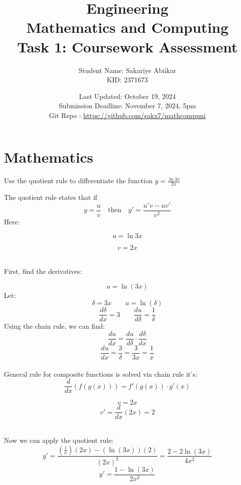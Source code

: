 \documentclass[a4paper, 12pt]{report}
\title{\vspace{3em} \Huge \textbf{Engineering\\ Mathematics and Computing}\\ \vspace{1em} \Large Task 1: Coursework Assessment}
\author{Student Name: Sakariye Abiikar\\ KID: 2371673}
\date{Last Updated: October 19, 2024\\ Submission Deadline: November 7, 2024, 5pm \\[1em] Git Repo : \color{blue}\url{https://github.com/sakx7/mathcompuni}}
\begin{document}
    
    \maketitle
    \thispagestyle{empty}
    
    \newpage
    \thispagestyle{empty}

    \chapter{Mathematics}
    
    \newpage\centering\restoregeometry
    
    \setcounter{page}{1}

    \begin{tcolorbox}[title={\color{black}{\section{Q1}}}, colback=white, colframe=black!30!white, boxrule=0.4mm, width=1\textwidth]
        Use the quotient rule to differentiate the function \( y=\frac{\ln 3 x}{2 x} \)
    \end{tcolorbox}
    
    The quotient rule states that if
    \[y = \frac{u}{v} \quad \text{then} \quad y' = \frac{u'v - uv'}{v^2}\]
    Here: \\[5pt]
    \begin{minipage}{0.4\textwidth}
        \[u = \ln 3x\] 
    \end{minipage}\hspace{-8em}
    \begin{minipage}{0.4\textwidth}
        \[v = 2x \]
    \end{minipage}\\[20pt]
    First, find the derivatives:\\[10pt]
    \begin{minipage}{0.43\textwidth}\centering
    \[u = \ln(3x)\]
    Let:
    \[\delta = 3x \qquad u = \ln(\delta)\]
    \[\frac{d\delta}{dx} = 3 \qquad \frac{du}{d\delta} = \frac{1}{\delta} \]
    Using the chain rule, we can find:
    \[\frac{du}{dx} = \frac{du}{d\delta} \cdot \frac{d\delta}{dx}\]
    \[\frac{du}{dx} = \frac{3}{\delta} = \frac{3}{3x}= \frac{1}{x}\]\\[1em]
    General rule for composite functions is solved via chain rule it's:\\[-20pt]
    \[\frac{d}{dx}(f(g(x))) = f'(g(x))\cdot g'(x)\]
    \end{minipage}\hspace{1em}\vrule\hspace{-2.5em}
    \begin{minipage}{0.4\textwidth}
        \[v = 2x\]
        \[v' = \frac{d}{dx}(2x) = 2\]
    \end{minipage}\\[30pt]
    Now we can apply the quotient rule:
    \[y' = \frac{\left(\frac{1}{x}\right)(2x) - (\ln(3x))(2)}{(2x)^2} = \frac{2 - 2\ln (3x)}{4x^2}\]
    \[\boxed{y' = \frac{1 - \ln(3x)}{2x^2}}\]
    
\end{document}
